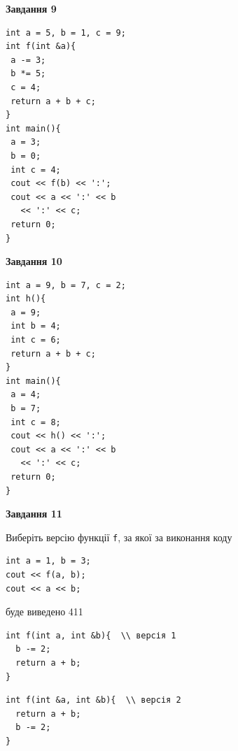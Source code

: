 \documentclass[12pt, ukrainian]{article}
\def\code#1{\Verb!#1!}
\begin{document}
{\begin {large}
\begin{minipage}[t]{11.0cm}
\end{minipage}


\begin{minipage}[t]{7.0cm}

\begin{center}
\textbf{Завдання 9}
\end{center}
\vspace{-8mm}

\begin{verbatim}
int a = 5, b = 1, c = 9;
int f(int &a){
 a -= 3;
 b *= 5;
 c = 4;
 return a + b + c;
}
int main(){
 a = 3;
 b = 0;
 int c = 4;
 cout << f(b) << ':';
 cout << a << ':' << b 
   << ':' << c;
 return 0;
}
\end{verbatim}



\begin{center}
\textbf{Завдання 10}
\end{center}
\vspace{-8mm}

\begin{verbatim}
int a = 9, b = 7, c = 2;
int h(){
 a = 9;
 int b = 4;
 int c = 6;
 return a + b + c;
}
int main(){
 a = 4;
 b = 7;
 int c = 8;
 cout << h() << ':';
 cout << a << ':' << b 
   << ':' << c;
 return 0;
}
\end{verbatim}

\end{minipage}
\vline \hspace{1mm}
\begin{minipage}[t]{11.0cm}

\begin{center}
\textbf{Завдання 11}
\end{center}
Виберіть версію функції \code{f}, за якої за виконання коду
\begin{verbatim}
int a = 1, b = 3;
cout << f(a, b);
cout << a << b;
\end{verbatim}

буде виведено 411

\begin{verbatim}
int f(int a, int &b){  \\ версія 1
  b -= 2;
  return a + b;
}
\end{verbatim}

\vspace{-8mm}\begin{verbatim}
int f(int &a, int &b){  \\ версія 2
  return a + b;
  b -= 2;
}
\end{verbatim}


\end{minipage}
\end{large}}
\end{document}
